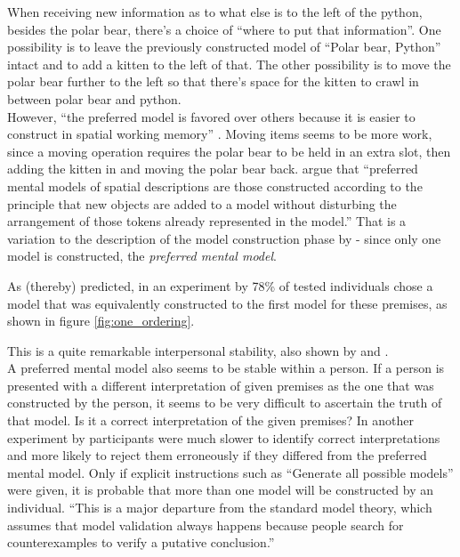 \documentclass[hidelinks]{scrartcl}
\begin{document}
When receiving new information as to what else is to the left of the python, besides the polar bear, there's a choice of ``where to put that information''. One possibility is to leave the previously constructed model of ``Polar bear, Python'' intact and to add a kitten to the left of that. The other possibility is to move the polar bear further to the left so that there's space for the kitten to crawl in between polar bear and python. \\
However, ``the preferred model is favored over others because it is easier to construct in spatial working memory'' \citep{Ragni.2013}. Moving items seems to be more work, since a moving operation requires the polar bear to be held in an extra slot, then adding the kitten in and moving the polar bear back. \cite{Ragni.2013} argue that ``preferred mental models of spatial descriptions are those constructed according to the principle that new objects are added to a model without disturbing the arrangement of those \gls{token}s already represented in the model.'' That is a variation to the description of the model construction phase by \citet{Johnson-Laird.1991} - since only one model is constructed, the \textit{preferred mental model}.

As (thereby) predicted, in an experiment by \cite{Ragni.2013} 78\% of tested individuals chose a model that was equivalently constructed to the first model for these \gls{premise}s, as shown in figure \ref{fig:one_ordering}.

This is a quite remarkable interpersonal stability, also shown by \cite{Knauff.2013} and \cite{Rauh.2005}.\\

A preferred mental model also seems to be stable within a person. If a person is presented with a different interpretation of given \gls{premise}s as the one that was constructed by the person, it seems to be very difficult to ascertain the truth of that model. Is it a correct interpretation of the given \gls{premise}s? In another experiment by \cite{Ragni.2013} participants were much slower to identify correct interpretations and more likely to reject them erroneously if they differed from the preferred mental model. Only if explicit instructions such as ``Generate all possible models'' were given, it is probable that more than one model will be constructed by an individual. ``This is a major departure from the standard model theory, which assumes that model validation always happens because people search for counterexamples to verify a putative conclusion.'' \citep{Ragni.2013}
\end{document}
